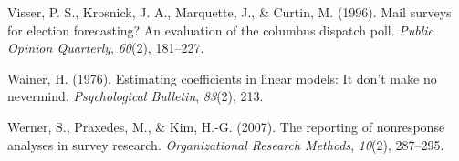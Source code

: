 \documentclass[
  man,floatsintext]{apa7}
\newlength{\cslhangindent}
\newlength{\cslentryspacingunit} %
\newenvironment{CSLReferences}[2] %
 {%
  \setlength{\parindent}{0pt}
  \ifodd #1
  \let\oldpar\par
  \def\par{\hangindent=\cslhangindent\oldpar}
  \fi
  \setlength{\parskip}{#2\cslentryspacingunit}
 }%
 {}
\begin{document}
\begin{CSLReferences}{1}{0}
\leavevmode{}%
Visser, P. S., Krosnick, J. A., Marquette, J., \& Curtin, M. (1996). Mail surveys for election forecasting? An evaluation of the columbus dispatch poll. \emph{Public Opinion Quarterly}, \emph{60}(2), 181--227.

\leavevmode{}%
Wainer, H. (1976). Estimating coefficients in linear models: It don't make no nevermind. \emph{Psychological Bulletin}, \emph{83}(2), 213.

\leavevmode{}%
Werner, S., Praxedes, M., \& Kim, H.-G. (2007). The reporting of nonresponse analyses in survey research. \emph{Organizational Research Methods}, \emph{10}(2), 287--295.

\end{CSLReferences}

\endgroup
\end{document}
